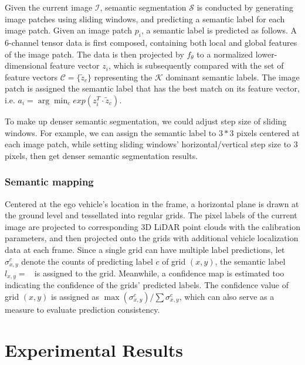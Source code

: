 \documentclass[letterpaper, 10 pt, conference]{ieeeconf}  %
\begin{document}
Given the current image $\mathcal{I}$, semantic segmentation $\mathcal{S}$ is conducted by generating image patches using sliding windows, and predicting a semantic label for each image patch.
Given an image patch $p_i$, a semantic label is predicted as follows. A 6-channel tensor data is first composed, containing both local and global features of the image patch. The data is then projected by $f_{\theta}$ to a normalized lower-dimensional feature vector $z_i$, which is subsequently compared with the set of feature vectors $\mathcal{C}=\{\tilde{z}_c\}$ representing the $\mathcal{K}$ dominant semantic labels. The image patch is assigned the semantic label that has the best match on its feature vector, i.e. $a_i = \arg\min_c exp(z_i^T \cdot \tilde{z}_c)$.

To make up denser semantic segmentation, we could adjust step size of sliding windows. For example, we can assign the semantic label to $3*3$ pixels centered at each image patch, while setting sliding windows' horizontal/vertical step size to 3 pixels, then get denser semantic segmentation results.

\subsubsection{Semantic mapping} \label{3_SM}

Centered at the ego vehicle's location in the frame, a horizontal plane is drawn at the ground level and tessellated into regular grids. The pixel labels of the current image are projected to corresponding 3D LiDAR point clouds with the calibration parameters, and then projected onto the grids with additional vehicle localization data at each frame. Since a single grid can have multiple label predictions, let $\sigma_{x,y}^c$ denote the counts of predicting label $c$ of grid $(x,y)$, the semantic label $l_{x,y}=\mathop{\text{argmax}_{c} (\sigma_{x,y}^c)}$ is assigned to the grid. Meanwhile, a confidence map is estimated too indicating the confidence of the grids' predicted labels. The confidence value of grid $(x,y)$ is assigned as $\max(\sigma_{x,y}^c)/\sum{\sigma_{x,y}^c}$, which can also serve as a measure to evaluate prediction consistency.

\section{Experimental Results}	\label{exp}
\end{document}
